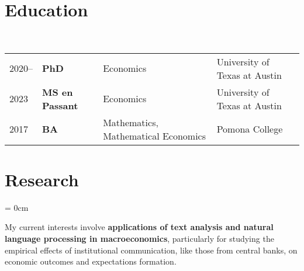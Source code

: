 \documentclass[a4paper, 10pt]{article}
\begin{document}
  \maketitle
  \thispagestyle{firststyle}
  \section{Education}
  ~\begin{tabular}{llll}
    2020-- & \textbf{PhD} & Economics & University of Texas at Austin\\
    2023 & \textbf{MS en Passant} & Economics & University of Texas at Austin\\
    2017 & \textbf{BA} & Mathematics, Mathematical Economics & Pomona College
  \end{tabular}
  \vspace*{0.25em}

  \section{Research}
  \begin{compactitem}\parskip = 0cm
    \item My current interests involve \textbf{applications of text analysis and natural language processing in macroeconomics}, particularly for studying the empirical effects of institutional communication, like those from central banks, on economic outcomes and expectations formation.
  \end{compactitem}
  \vspace*{0.25em}

  \begin{publications}
  \end{publications}
  \vspace*{-0.75em}
\end{document}

